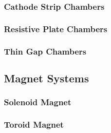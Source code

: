 		\subsubsection{Cathode Strip Chambers}

		\subsubsection{Resistive Plate Chambers}

		\subsubsection{Thin Gap Chambers}

	\subsection{Magnet Systems}

		\subsubsection{Solenoid Magnet}

		\subsubsection{Toroid Magnet}

		